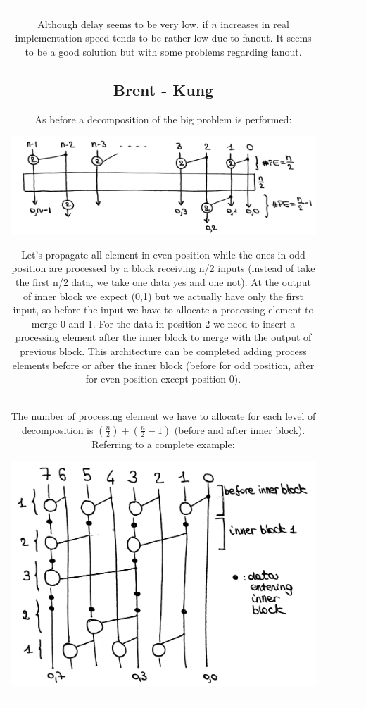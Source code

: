 \begin{center}
\begin{tabular}{|c|c|c|c|c|}
\begin{itemize}
\end{itemize}

Although delay seems to be very low, if $n$ increases in real implementation speed tends to be rather low due to fanout. It seems to be a good solution but with some problems regarding fanout.

\subsection{Brent - Kung}
As before a decomposition of the big problem is performed:

\begin{center}
  \includegraphics[width=0.7\linewidth]{img/img2/22}
\end{center}

Let's propagate all element in even position while the ones in odd position are processed by a block receiving n/2 inputs (instead of take the first n/2 data, we take one data yes and one not). At the output of inner block we expect (0,1) but we actually have only the first input, so before the input we have to allocate a processing element to merge 0 and 1. For the data in position 2 we need to insert a processing element after the inner block to merge with the output of previous block. This architecture can be completed adding process elements before or after the inner block (before for odd position, after for even position except position 0).\\

The number of processing element we have to allocate for each level of decomposition is $(\frac{n}{2}) + ( \frac{n}{2} -1)$ (before and after inner block). Referring to a complete example:

\begin{center}
  \includegraphics[width=0.7\linewidth]{img/img2/23}
\end{center}


\end{tabular}
\end{center}

